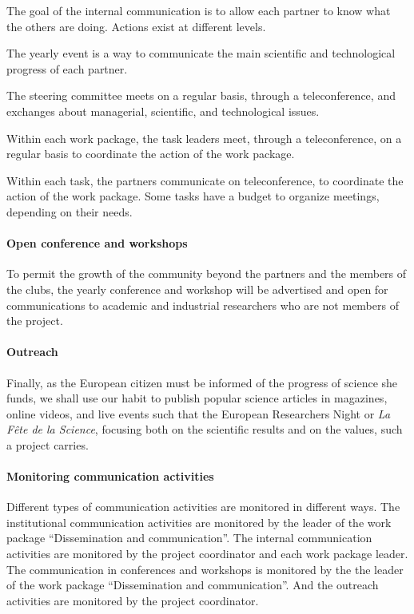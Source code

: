 The goal of the internal communication is to allow each partner to
know what the others are doing. Actions exist at different levels.

\begin{compactitem}
\item The yearly event is a way to communicate the main scientific and
  technological progress of each partner.
\item The steering committee meets on a regular basis, through a
  teleconference, and exchanges about managerial, scientific, and
  technological issues.
\item Within each work package, the task leaders meet, through a
  teleconference, on a regular basis to coordinate the action of the
  work package.
\item Within each task, the partners communicate on teleconference, to
  coordinate the action of the work package. Some tasks have a budget
  to organize meetings, depending on their needs.
\end{compactitem}

\paragraph*{Open conference and workshops}

To permit the growth of the community beyond the partners and the
members of the clubs, the yearly conference and workshop will be
advertised and open for communications to academic and industrial
researchers who are not members of the project.

\paragraph*{Outreach}

Finally, as the European citizen must be informed of the progress of
science she funds, we shall use our habit to publish popular science
articles in magazines, online videos, and live events such that the
European Researchers Night or {\em La Fête de la Science}, focusing
both on the scientific results and on the values, such a project
carries.

\paragraph*{Monitoring communication activities}

Different types of communication activities are monitored in
different ways.  The institutional communication activities are
monitored by the leader of the work package ``Dissemination and
communication''. The internal communication activities are monitored
by the project coordinator and each work package leader. The communication
in conferences and workshops is monitored by the
the leader of the work package ``Dissemination and
communication''. And the outreach activities are monitored by the
project coordinator.

